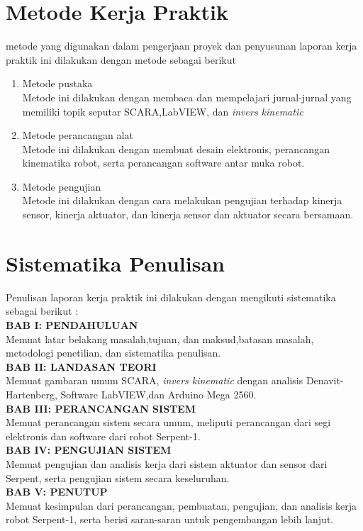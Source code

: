 \section{Metode Kerja Praktik}
metode yang digunakan dalam pengerjaan proyek dan penyusunan laporan kerja praktik ini dilakukan dengan metode sebagai berikut

\begin{enumerate}
	\item Metode pustaka\\
	Metode ini dilakukan dengan membaca dan mempelajari jurnal-jurnal yang memiliki topik seputar SCARA,LabVIEW, dan \textit{invers kinematic}
	
	\item Metode perancangan alat\\
	Metode ini dilakukan dengan membuat desain elektronis, perancangan kinematika robot, serta perancangan software antar muka robot.
	
	\item Metode pengujian\\
	Metode ini dilakukan dengan cara melakukan pengujian terhadap kinerja sensor, kinerja aktuator, dan kinerja sensor dan aktuator secara bersamaan.
	
\end{enumerate}

\section{Sistematika Penulisan}
Penulisan laporan kerja praktik ini dilakukan dengan mengikuti sistematika sebagai berikut :\\
\noindent
\textbf{BAB I\hspace*{0.6cm}: PENDAHULUAN}\\
\noindent
Memuat latar belakang masalah,tujuan, dan maksud,batasan masalah, metodologi penetilian, dan sistematika penulisan.\\
\noindent
\textbf{BAB II\hspace*{0.5cm}: LANDASAN TEORI}\\
\noindent
Memuat gambaran umum SCARA, \textit{invers kinematic} dengan analisis Denavit-Hartenberg, Software LabVIEW,dan Arduino Mega 2560.\\
\textbf{BAB III\hspace*{0.375cm}:  PERANCANGAN SISTEM}\\
\noindent
Memuat perancangan sistem secara umum, meliputi perancangan dari segi elektronis dan software dari robot Serpent-1.\\
\textbf{BAB IV\hspace*{0.4cm}: PENGUJIAN SISTEM}\\
\noindent
Memuat pengujian dan analisis kerja dari sistem aktuator dan sensor dari Serpent, serta pengujian sistem secara keseluruhan.\\
\textbf{BAB V\hspace*{0.6cm}: PENUTUP}\\
Memuat kesimpulan dari perancangan, pembuatan, pengujian, dan analisis kerja robot Serpent-1, serta berisi saran-saran untuk pengembangan lebih lanjut.\\